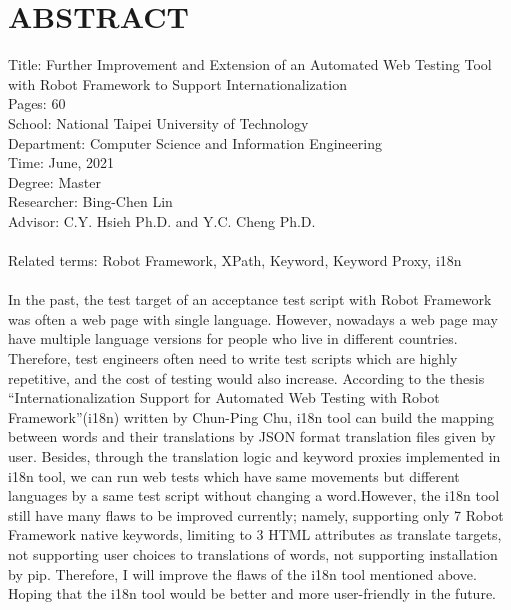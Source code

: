 \chapter*{ABSTRACT}


\noindent
Title: Further Improvement and Extension of an Automated Web Testing Tool 
with Robot Framework to Support Internationalization\\
Pages: 60\\
School: National Taipei University of Technology\\
Department: Computer Science and Information Engineering\\
Time: June, 2021\\
Degree: Master\\
Researcher: Bing-Chen Lin\\
Advisor: C.Y. Hsieh Ph.D. and Y.C. Cheng Ph.D.\\
\hspace*{\fill}\\
Related terms: Robot Framework, XPath, Keyword, Keyword Proxy, i18n\\
\hspace*{\fill}\\
%
\indent
In the past, the test target of an acceptance test script with Robot Framework was often a  web page with single language. However, nowadays a web page may have multiple language versions for people who live in different countries. Therefore, test engineers often need to write test scripts which are highly repetitive, and the cost of testing would also increase. According to the thesis “Internationalization Support for Automated Web Testing with Robot Framework”(i18n) written by Chun-Ping Chu, i18n tool can build the mapping between words and their translations by JSON format translation files given by user. Besides, through the translation logic and keyword proxies implemented in i18n tool, we can run web tests which have same movements but different languages by a same test script without changing a word.However, the i18n tool still have many flaws to be improved currently; namely, supporting only 7 Robot Framework native keywords, limiting to 3 HTML attributes as translate targets, not supporting user choices to translations of words, not supporting installation by pip. Therefore, I will improve the flaws of the i18n tool mentioned above. Hoping that the i18n tool would be better and more user-friendly in the future.
